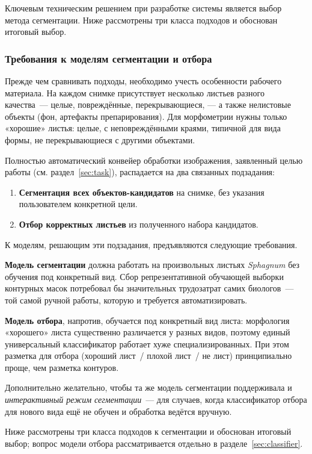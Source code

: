 Ключевым техническим решением при разработке системы является выбор метода сегментации.
Ниже рассмотрены три класса подходов и обоснован итоговый выбор.

\subsubsection*{Требования к моделям сегментации и отбора}

Прежде чем сравнивать подходы, необходимо учесть особенности рабочего материала.
На каждом снимке присутствует несколько листьев разного качества~--- целые, повреждённые,
перекрывающиеся, --- а также нелистовые объекты (фон, артефакты препарирования). Для
морфометрии нужны только «хорошие» листья: целые, с неповреждёнными краями, типичной для
вида формы, не перекрывающиеся с другими объектами.

Полностью автоматический конвейер обработки изображения, заявленный целью работы
(см. раздел~\ref{sec:task}), распадается на два связанных подзадания:
\begin{enumerate}
    \item \textbf{Сегментация всех объектов-кандидатов} на снимке, без указания
          пользователем конкретной цели.
    \item \textbf{Отбор корректных листьев} из полученного набора кандидатов.
\end{enumerate}

К моделям, решающим эти подзадания, предъявляются следующие требования.

\textbf{Модель сегментации} должна работать на произвольных листьях \textit{Sphagnum}
без обучения под конкретный вид. Сбор
репрезентативной обучающей выборки контурных масок потребовал бы значительных трудозатрат
самих биологов~--- той самой ручной работы, которую и требуется автоматизировать.

\textbf{Модель отбора}, напротив, обучается под конкретный вид листа: морфология
«хорошего» листа существенно различается у разных видов, поэтому единый универсальный
классификатор работает хуже специализированных. При этом разметка для отбора
(хороший лист~/ плохой лист~/ не лист) принципиально проще, чем разметка контуров.

Дополнительно желательно, чтобы та же модель сегментации поддерживала и
\textit{интерактивный режим сегментации}~--- для случаев, когда классификатор отбора для
нового вида ещё не обучен и обработка ведётся вручную.

Ниже рассмотрены три класса подходов к сегментации и обоснован итоговый выбор; вопрос
модели отбора рассматривается отдельно в разделе~\ref{sec:classifier}.

